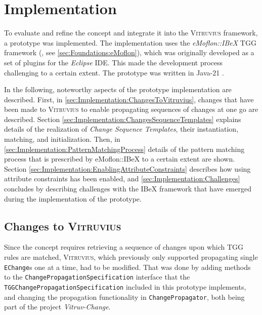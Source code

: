 
\chapter{Implementation}
\label{ch:Implementation}

To evaluate and refine the concept and integrate it into the \textsc{Vitruvius} framework, a prototype was implemented.
The implementation uses the \emph{eMoflon::IBeX} TGG framework (\cite{eMoflonIBeX_weidmann_incremental_nodate}, see \autoref{sec:Foundations:eMoflon}), which was originally developed as a set of plugins for the \emph{Eclipse} IDE. This made the development process challenging to a certain extent.
The prototype was written in Java-21 \cite{noauthor_jdk_21nodate}.

In the following, noteworthy aspects of the prototype implementation are described.
First, in \autoref{sec:Implementation:ChangesToVitruvius}, changes that have been made to \textsc{Vitruvius} to enable propagating sequences of changes at one go are described.
Section \ref{sec:Implementation:ChangesSequenceTemplates} explains details of the realization of \emph{Change Sequence Templates}, their instantiation, matching, and initialization.
Then, in \autoref{sec:Implementation:PatternMatchingProcess} details of the pattern matching process that is prescribed by eMoflon::IBeX to a certain extent are shown.
Section \ref{sec:Implementation:EnablingAttributeConstraints} describes how using attribute constraints has been enabled, and \autoref{sec:Implementation:Challenges} concludes by describing challenges with the IBeX framework that have emerged during the implementation of the prototype.

\section{Changes to \textsc{Vitruvius}}
\label{sec:Implementation:ChangesToVitruvius}
Since the concept requires retrieving a sequence of changes upon which TGG rules are matched, \textsc{Vitruvius}, which previously only supported propagating single \texttt{EChange}s one at a time, had to be modified.
That was done by adding methods to the 
\newline\texttt{ChangePropagationSpecification} interface that the \newline\texttt{TGGChangePropagationSpecification} included in this prototype implements, and changing the propagation functionality in \texttt{ChangePropagator}, both being part of the project \emph{Vitruv-Change}.

